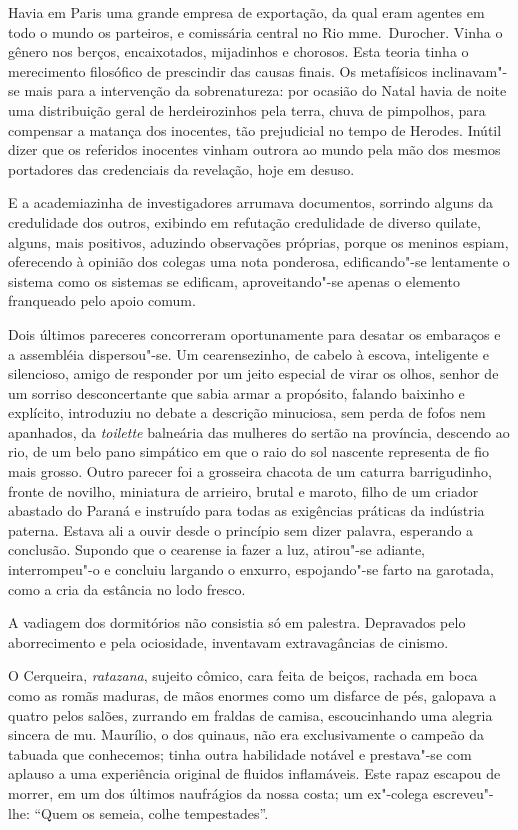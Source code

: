 Havia em Paris uma grande empresa de exportação, da qual eram agentes
em todo o mundo os parteiros, e comissária central no Rio mme.~Durocher. 
Vinha o gênero nos berços, encaixotados, mijadinhos e chorosos. Esta teoria 
tinha o merecimento filosófico de prescindir das causas finais. Os metafísicos
inclinavam"-se mais para a intervenção da sobrenatureza: por ocasião
do Natal havia de noite uma distribuição geral de herdeirozinhos pela
terra, chuva de pimpolhos, para compensar a matança dos inocentes, tão
prejudicial no tempo de Herodes. Inútil dizer que os referidos
inocentes vinham outrora ao mundo pela mão dos mesmos portadores das
credenciais da revelação, hoje em desuso. 

E a academiazinha de
investigadores arrumava documentos, sorrindo alguns da credulidade dos
outros, exibindo em refutação credulidade de diverso quilate, alguns,
mais positivos, aduzindo observações próprias, porque os meninos
espiam, oferecendo à opinião dos colegas uma nota ponderosa,
edificando"-se lentamente o sistema como os sistemas se edificam,
aproveitando"-se apenas o elemento franqueado pelo apoio comum. 

Dois últimos pareceres concorreram oportunamente para desatar os embaraços e
a assembléia dispersou"-se. Um cearensezinho, de cabelo à escova,
inteligente e silencioso, amigo de responder por um jeito especial de
virar os olhos, senhor de um sorriso desconcertante que sabia armar a
propósito, falando baixinho e explícito, introduziu no debate a
descrição minuciosa, sem perda de fofos nem apanhados, da \textit{toilette}
balneária das mulheres do sertão na província, descendo ao rio, de um
belo pano simpático em que o raio do sol nascente representa de fio
mais grosso. Outro parecer foi a grosseira chacota de um caturra
barrigudinho, fronte de novilho, miniatura de arrieiro, brutal e
maroto, filho de um criador abastado do Paraná e instruído para todas
as exigências práticas da indústria paterna. Estava ali a ouvir desde o
princípio sem dizer palavra, esperando a conclusão. Supondo que o
cearense ia fazer a luz, atirou"-se adiante, interrompeu"-o e
concluiu largando o enxurro, espojando"-se farto na garotada, como a
cria da estância no lodo fresco. 

A vadiagem dos dormitórios não
consistia só em palestra. Depravados pelo aborrecimento e pela
ociosidade, inventavam extravagâncias de cinismo. 

O Cerqueira, \textit{ratazana}, sujeito cômico, cara feita de beiços, rachada em boca como as
romãs maduras, de mãos enormes como um disfarce de pés, galopava a
quatro pelos salões, zurrando em fraldas de camisa, escoucinhando uma
alegria sincera de mu. Maurílio, o dos quinaus, não era exclusivamente
o campeão da tabuada que conhecemos; tinha outra habilidade notável e
prestava"-se com aplauso a uma experiência original de fluidos
inflamáveis. Este rapaz escapou de morrer, em um dos últimos naufrágios
da nossa costa; um ex"-colega escreveu"-lhe: ``Quem os semeia, colhe
tempestades''. 

